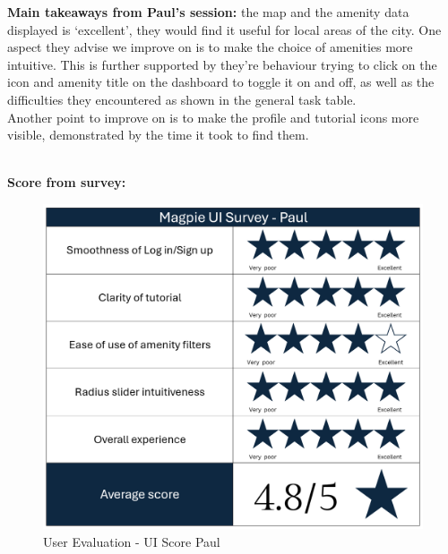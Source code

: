 \textbf{Main takeaways from Paul's session: }the map and the amenity data displayed is `excellent', they would find it useful for local areas of the city. One aspect they advise we improve on is to make the choice of amenities more intuitive. This is further supported by they're behaviour trying to click on the icon and amenity title on the dashboard to toggle it on and off, as well as the difficulties they encountered as shown in the general task table.\\
Another point to improve on is to make the profile and tutorial icons more visible, demonstrated by the time it took to find them.\\ \\

\newpage{}

\noindent\textbf{Score from survey: }
\begin{figure}[h!]
    \centering
    \includegraphics[width=\textwidth]{images/survey-paul.png}
    \caption{User Evaluation - UI Score Paul}
\end{figure}

\newpage{}


